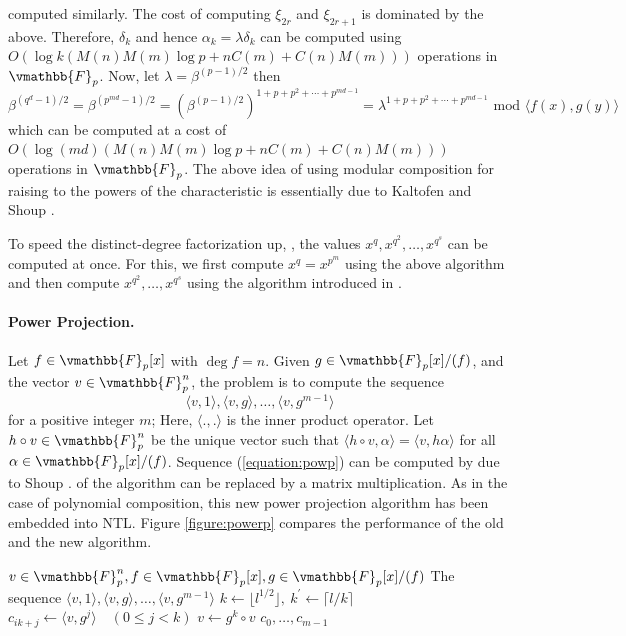 computed similarly. The cost of computing $\xi_{2r}$ and $\xi_{2r + 1}$ is dominated by the above. 
Therefore, $\delta_k$ and hence $\alpha_k = \lambda\delta_k$ can be computed using $O(\log 
k(M(n)M(m)\log p + nC(m) + C(n)M(m)))$ operations in $\vmathbb{F}_p$. Now, let $\lambda = \beta^{(p - 
1) / 2}$ then
$$
\beta^{(q^d - 1) / 2} = \beta^{(p^{md} - 1) / 2} = \left( \beta^{(p - 1) / 2} \right)^{1 + p + p^2 + 
\cdots + p^{md - 1}} = \lambda^{1 + p + p^2 + \cdots + p^{md - 1}} \text{ mod } \langle f(x), g(y) 
\rangle
$$
which can be computed at a cost of $O(\log(md)(M(n)M(m)\log p + nC(m) + C(n)M(m)))$ operations in 
$\vmathbb{F}_p$. The above idea of using modular composition for raising to the powers of the 
characteristic is essentially due to Kaltofen and Shoup \cite{KaltofenShoup1997}.

To speed the distinct-degree factorization up, , the values $x^q, 
x^{q^2}, \dots, x^{q^s}$ can be computed at once. For this, we first compute $x^q = x^{p^m}$ using 
the above algorithm and then compute $x^{q^2}, \dots, x^{q^s}$ using the algorithm introduced in 
\cite{zurShoup1992}. 

\paragraph{Power Projection.}
Let $f \in \vmathbb{F}_p[x]$ with $\deg f = n$. Given $g \in \vmathbb{F}_p[x]/(f)$, and the vector $v 
\in \vmathbb{F}_p^n$, the problem is to compute the sequence
\begin{equation}
\label{equation:powp}
\langle v, 1\rangle, \langle v, g\rangle , \dots, \langle v, g^{m - 1} \rangle
\end{equation}
for a positive integer $m$; Here, $\langle ., .\rangle$ is the inner product operator. Let $h\circ v 
\in \vmathbb{F}_p^n$ be the unique vector such that $\langle h\circ v, \alpha \rangle = \langle v, 
h\alpha \rangle$ for all $\alpha \in \vmathbb{F}_p[x]/(f)$. Sequence (\ref{equation:powp}) can be 
computed by  due to Shoup \cite{Shoup1999}.  
of the algorithm can be replaced by a matrix multiplication. As in the case of polynomial 
composition, this new power projection algorithm has been embedded into NTL. Figure 
\ref{figure:powerp} compares the performance of the old and the new algorithm.

\begin{algorithm}
\label{algorithm:powerp}
\begin{algorithmic}[1]
\REQUIRE  $v \in \vmathbb{F}_p^n, f  \in \vmathbb{F}_p[x], g \in \vmathbb{F}_p[x]/(f)$
\ENSURE   The sequence $\langle v, 1\rangle, \langle v, g\rangle , \dots, \langle v, g^{m - 1} 
\rangle$
\STATE $k \leftarrow \lfloor l^{1/2} \rfloor, \: k^\prime \leftarrow \lceil l/k \rceil$
\label{step:powerp-for}
	\STATE $c_{ik + j} \leftarrow \langle v, g^j\rangle \quad (0 \le j < k)$
	\STATE $v \leftarrow g^k \circ v$
\ENDFOR
\RETURN $c_0, \dots, c_{m - 1}$
\end{algorithmic}
\end{algorithm}

